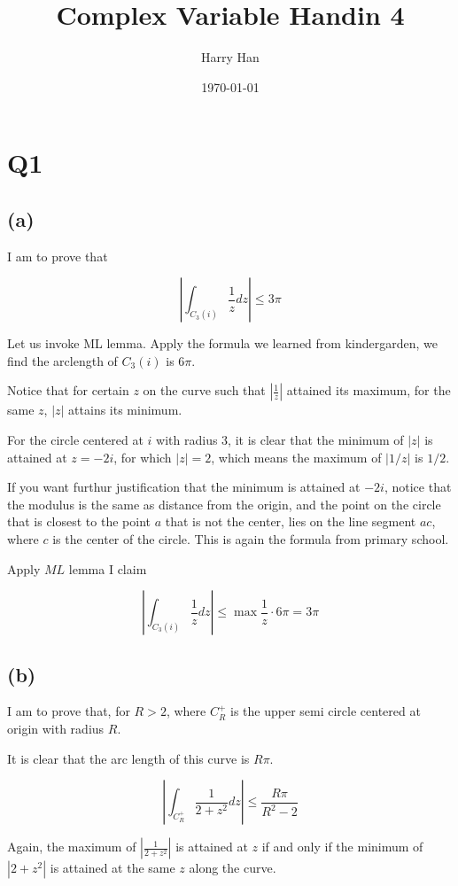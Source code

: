 \documentclass[12pt, a4paper]{article}
\title{Complex Variable Handin 4}
\author{Harry Han}
\date{\today}
\theoremstyle{definition}
\theoremstyle{remark}
\begin{document}
\maketitle

\section{Q1} %
\label{sec:Q1}
\subsection{(a)}
I am to prove that 

\[
  \left|\int_{C_3(i)} \frac{1}{z} dz \right| \leq 3 \pi
\]

Let us invoke ML lemma. Apply the formula we learned from kindergarden, we find the arclength of $C_3(i)$ is $6 \pi$.

Notice that for certain $z$ on the curve such that $|\frac{1}{z}|$ attained its maximum, for the same $z$, $|z|$ attains its minimum.

For the circle centered at $i$ with radius 3, it is clear that the minimum of $|z|$ is attained at $z=-2i$, for which $|z| = 2$, which means the maximum of $|1/z|$ is $1/2$.

If you want furthur justification that the minimum is attained at $-2i$, notice that the modulus is the same as distance from the origin, and the point on the circle that is closest to the point $a$ that is not the center, lies on the line segment $ac$, where $c$ is the center of the circle. This is again the formula from primary school. 

Apply $ML$ lemma I claim 

\[
  \left|\int_{C_3(i)} \frac{1}{z} dz \right| \leq \max {\frac{1}{z}}\cdot 6 \pi = 3\pi 
\]
  
\subsection{(b)} 

I am to prove that, for $R > 2$, where $C_{R}^+$ is the upper semi circle centered at origin with radius $R$.

It is clear that the arc length of this curve is $R\pi$.

\[
  \left| \int_{C^+_{R}} \frac{1}{2+z^2} dz \right| \leq \frac{R\pi}{R^2-2}
\]

Again, the maximum of $|\frac{1}{2+z^2}|$ is attained at $z$ if and only if the minimum of $|2+z^2|$ is attained at the same $z$ along the curve.
\end{document}
